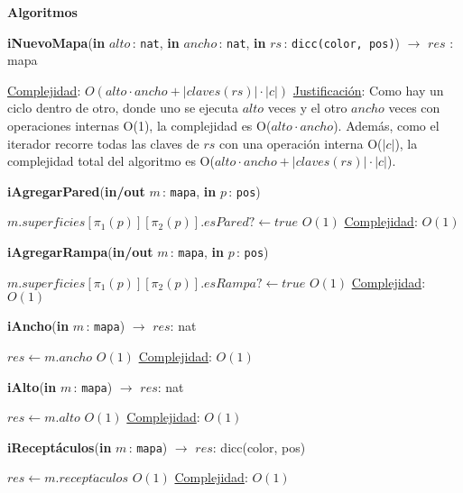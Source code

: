 \documentclass[a4paper,10pt]{article}
\let\TipoVariable=\texttt
\let\ModificadorArgumento=\textbf
\newcommand{\In}[2]{\ModificadorArgumento{in} \ensuremath{#1}\,: \TipoVariable{#2}\xspace}
\newcommand{\Inout}[2]{\ModificadorArgumento{in/out} \ensuremath{#1}\,: \TipoVariable{#2}\xspace}
\newenvironment{Algoritmos}{%
  \vspace*{2ex}%
  \noindent\textbf{\Large Algoritmos}%
  \vspace*{2ex}%
}{}
\begin{document}
\begin{Algoritmos}
\begin{algorithm}[H]{\textbf{iNuevoMapa}(\In{alto}{nat}, \In{ancho}{nat}, \In{rs}{dicc(color, pos)}) $\to$ $res$ : mapa}
\begin{algorithmic}[1]
      \medskip
      \Statex \underline{Complejidad}: $O(alto \cdot ancho + |claves(rs)| \cdot |c|)$
      \Statex \underline{Justificación}: Como hay un ciclo dentro de otro, donde uno se ejecuta $alto$ veces y el otro $ancho$ veces con operaciones internas O(1), la complejidad es O($alto \cdot ancho$). Además, como el iterador recorre todas las claves de $rs$ con una operación interna O($|c|$), la complejidad total del algoritmo es O($alto \cdot ancho + |claves(rs)| \cdot |c|$).
      \end{algorithmic}
\end{algorithm}  
  
  
\begin{algorithm}[H]{\textbf{iAgregarPared}(\Inout{m}{mapa}, \In{p}{pos})}
      \begin{algorithmic}[1]
       \State $m.superficies[\pi_{1}(p)][\pi_{2}(p)].esPared? \gets true$   \Comment $O(1)$
      \medskip
      \Statex \underline{Complejidad}: $O(1)$
      \end{algorithmic}
\end{algorithm}    
  
  
\begin{algorithm}[H]{\textbf{iAgregarRampa}(\Inout{m}{mapa}, \In{p}{pos})}
      \begin{algorithmic}[1]
       \State $m.superficies[\pi_{1}(p)][\pi_{2}(p)].esRampa? \gets true$   \Comment $O(1)$
      \medskip
      \Statex \underline{Complejidad}: $O(1)$
      \end{algorithmic}
\end{algorithm}   
  
  
\begin{algorithm}[H]{\textbf{iAncho}(\In{m}{mapa}) $\to$ $res$: nat}
      \begin{algorithmic}[1]
       \State $res \gets m.ancho$   \Comment $O(1)$
      \medskip
      \Statex \underline{Complejidad}: $O(1)$
      \end{algorithmic}
\end{algorithm}   

\begin{algorithm}[H]{\textbf{iAlto}(\In{m}{mapa}) $\to$ $res$: nat}
      \begin{algorithmic}[1]
       \State $res \gets m.alto$   \Comment $O(1)$
      \medskip
      \Statex \underline{Complejidad}: $O(1)$
      \end{algorithmic}
\end{algorithm}    

\begin{algorithm}[H]{\textbf{iReceptáculos}(\In{m}{mapa}) $\to$ $res$: dicc(color, pos)}
      \begin{algorithmic}[1]
       \State $res \gets m.recept\acute{a}culos$   \Comment $O(1)$
      \medskip
      \Statex \underline{Complejidad}: $O(1)$
      \end{algorithmic}
\end{algorithm}     
  

\end{Algoritmos}
\end{document}
